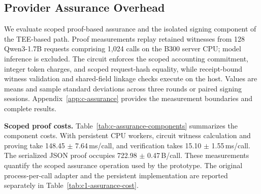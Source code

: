 \subsection{Provider Assurance Overhead}
\label{sec:evaluation-assurance}

We evaluate scoped proof-based assurance and the isolated signing component
of the TEE-based path. Proof measurements replay retained witnesses from
128 Qwen3-1.7B requests comprising 1,024 calls on the B300 server CPU;
model inference is excluded. The circuit enforces the scoped accounting
commitment, integer token charges, and scoped request-hash equality, while
receipt-bound witness validation and shared-field linkage checks execute
on the host. Values are means and sample standard deviations across three
rounds or paired signing sessions. Appendix~\ref{app:c-assurance} provides
the measurement boundaries and complete results.

\noindent\textbf{Scoped proof costs.}
Table~\ref{tab:c-assurance-components} summarizes the component costs.
With persistent CPU workers, circuit witness calculation and proving take
148.45 $\pm$ 7.64\,ms/call, and verification takes
15.10 $\pm$ 1.55\,ms/call. The serialized JSON proof occupies
722.98 $\pm$ 0.47\,B/call. These measurements quantify the scoped
assurance operation used by the prototype. The original process-per-call
adapter and the persistent implementation are reported separately in
Table~\ref{tab:c1-assurance-cost}.

